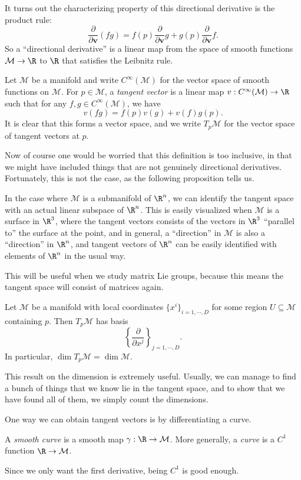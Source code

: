 \documentclass[a4paper]{article}
\begin{document}
It turns out the characterizing property of this directional derivative is the product rule:
\[
  \frac{\partial}{\partial \mathbf{v}}(fg) = f(p) \frac{\partial}{\partial \mathbf{v}} g + g(p) \frac{\partial}{\partial \mathbf{v}}f.
\]
So a ``directional derivative'' is a linear map from the space of smooth functions $\mathcal{M} \to \R$ to $\R$ that satisfies the Leibnitz rule.
\begin{defi}
  Let $\mathcal{M}$ be a manifold and write $C^\infty(\mathcal{M})$ for the vector space of smooth functions on $\mathcal{M}$. For $p \in \mathcal{M}$, a \emph{tangent vector} is a linear map $v: C^\infty(\mathcal{M}) \to \R$ such that for any $f, g \in C^\infty(\mathcal{M})$, we have
  \[
    v(fg) = f(p) v(g) + v(f) g(p).
  \]
  It is clear that this forms a vector space, and we write $T_p \mathcal{M}$ for the vector space of tangent vectors at $p$.
\end{defi}
Now of course one would be worried that this definition is too inclusive, in that we might have included things that are not genuinely directional derivatives. Fortunately, this is not the case, as the following proposition tells us.

In the case where $\mathcal{M}$ is a submanifold of $\R^n$, we can identify the tangent space with an actual linear subspace of $\R^n$. This is easily visualized when $\mathcal{M}$ is a surface in $\R^3$, where the tangent vectors consists of the vectors in $\R^3$ ``parallel to'' the surface at the point, and in general, a ``direction'' in $\mathcal{M}$ is also a ``direction'' in $\R^n$, and tangent vectors of $\R^n$ can be easily identified with elements of $\R^n$ in the usual way.

This will be useful when we study matrix Lie groups, because this means the tangent space will consist of matrices again.
\begin{prop}
  Let $\mathcal{M}$ be a manifold with local coordinates $\{x^i\}_{i = 1, \cdots, D}$ for some region $U \subseteq \mathcal{M}$ containing $p$. Then $T_p \mathcal{M}$ has basis
  \[
    \left\{\frac{\partial}{\partial x^j}\right\}_{j = 1, \cdots, D}.
  \]
  In particular, $\dim T_p \mathcal{M} = \dim \mathcal{M}$.
\end{prop}
This result on the dimension is extremely useful. Usually, we can manage to find a bunch of things that we know lie in the tangent space, and to show that we have found all of them, we simply count the dimensions.

One way we can obtain tangent vectors is by differentiating a curve.
\begin{defi}
  A \emph{smooth curve} is a smooth map $\gamma: \R \to \mathcal{M}$. More generally, a \emph{curve} is a $C^1$ function $\R \to \mathcal{M}$.
\end{defi}
Since we only want the first derivative, being $C^1$ is good enough.
\end{document}
